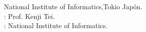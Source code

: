 \item[\bi{March}{Marzo} 2014 - Junio 2014] National Institute of Informatics,Tokio Jap\'on.\\
    : Prof. Kenji Tei.\\
    : National Institute of Informatics.

